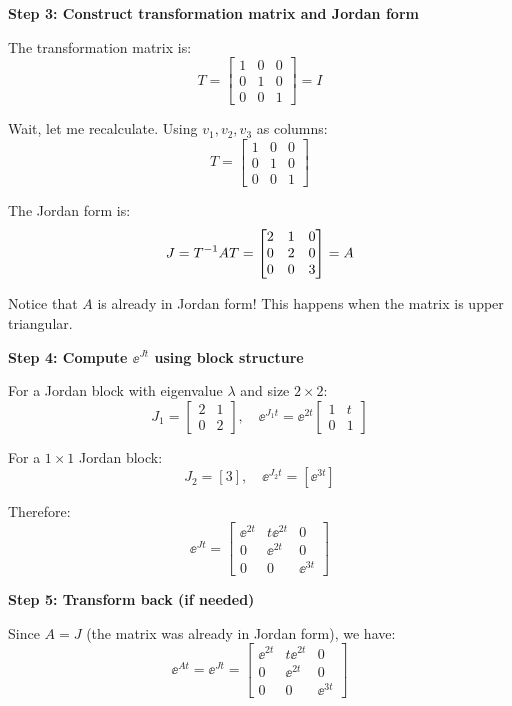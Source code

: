 \documentclass[11pt,a4paper]{article}
\begin{document}
\textbf{Step 3: Construct transformation matrix and Jordan form}

The transformation matrix is:
\[
T = \begin{bmatrix} 1 & 0 & 0 \\ 0 & 1 & 0 \\ 0 & 0 & 1 \end{bmatrix} = I
\]

Wait, let me recalculate. Using $v_1, v_2, v_3$ as columns:
\[
T = \begin{bmatrix} 1 & 0 & 0 \\ 0 & 1 & 0 \\ 0 & 0 & 1 \end{bmatrix}
\]

The Jordan form is:
\[
J = T^{-1} AT = \begin{bmatrix} 2 & 1 & 0 \\ 0 & 2 & 0 \\ 0 & 0 & 3 \end{bmatrix} = A
\]

Notice that $A$ is already in Jordan form! This happens when the matrix is upper triangular.

\textbf{Step 4: Compute $\ee^{Jt}$ using block structure}

For a Jordan block with eigenvalue $\lambda$ and size $2 \times 2$:
\[
J_1 = \begin{bmatrix} 2 & 1 \\ 0 & 2 \end{bmatrix}, \quad \ee^{J_1 t} = \ee^{2t}\begin{bmatrix} 1 & t \\ 0 & 1 \end{bmatrix}
\]

For a $1 \times 1$ Jordan block:
\[
J_2 = [3], \quad \ee^{J_2 t} = [\ee^{3t}]
\]

Therefore:
\[
\ee^{Jt} = \begin{bmatrix} \ee^{2t} & t\ee^{2t} & 0 \\ 0 & \ee^{2t} & 0 \\ 0 & 0 & \ee^{3t} \end{bmatrix}
\]

\textbf{Step 5: Transform back (if needed)}

Since $A = J$ (the matrix was already in Jordan form), we have:
\[
\ee^{At} = \ee^{Jt} = \begin{bmatrix} \ee^{2t} & t\ee^{2t} & 0 \\ 0 & \ee^{2t} & 0 \\ 0 & 0 & \ee^{3t} \end{bmatrix}
\]
\end{document}
